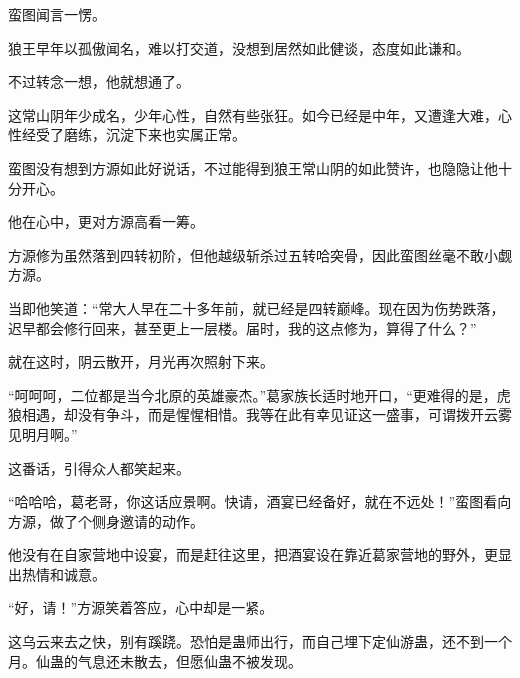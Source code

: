 \begin{this_body}
蛮图闻言一愣。

狼王早年以孤傲闻名，难以打交道，没想到居然如此健谈，态度如此谦和。

不过转念一想，他就想通了。

这常山阴年少成名，少年心性，自然有些张狂。如今已经是中年，又遭逢大难，心性经受了磨练，沉淀下来也实属正常。

蛮图没有想到方源如此好说话，不过能得到狼王常山阴的如此赞许，也隐隐让他十分开心。

他在心中，更对方源高看一筹。

方源修为虽然落到四转初阶，但他越级斩杀过五转哈突骨，因此蛮图丝毫不敢小觑方源。

当即他笑道：“常大人早在二十多年前，就已经是四转巅峰。现在因为伤势跌落，迟早都会修行回来，甚至更上一层楼。届时，我的这点修为，算得了什么？”

就在这时，阴云散开，月光再次照射下来。

“呵呵呵，二位都是当今北原的英雄豪杰。”葛家族长适时地开口，“更难得的是，虎狼相遇，却没有争斗，而是惺惺相惜。我等在此有幸见证这一盛事，可谓拨开云雾见明月啊。”

这番话，引得众人都笑起来。

“哈哈哈，葛老哥，你这话应景啊。快请，酒宴已经备好，就在不远处！”蛮图看向方源，做了个侧身邀请的动作。

他没有在自家营地中设宴，而是赶往这里，把酒宴设在靠近葛家营地的野外，更显出热情和诚意。

“好，请！”方源笑着答应，心中却是一紧。

这乌云来去之快，别有蹊跷。恐怕是蛊师出行，而自己埋下定仙游蛊，还不到一个月。仙蛊的气息还未散去，但愿仙蛊不被发现。

\end{this_body}

